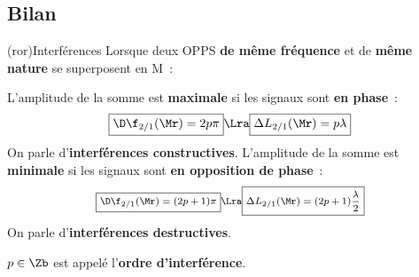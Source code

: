 \documentclass[../../main/main.tex]{subfiles}
\begin{document}
\subsection{Bilan}

\begin{tcb}[breakable](ror){Interférences}
	Lorsque deux OPPS \textbf{de même fréquence} et de \textbf{même nature} se
	superposent en M~:
	\begin{isd}
		L'amplitude de la somme est \textbf{maximale} si les signaux sont
		\textbf{en phase}~:
		\[
			\boxed{\D\f_{2/1}(\Mr) = 2p\pi}
			\Lra
			\boxed{\Delta{L}_{2/1}(\Mr) = p\lambda}
		\]
		On parle d'\textbf{interférences constructives}.
		\tcblower
		L'amplitude de la somme est \textbf{minimale} si les signaux sont
		\textbf{en opposition de phase}~:
		\[
			\footnotesize
			\boxed{\D\f_{2/1}(\Mr) = (2p+1)\pi}
			\Lra
			\boxed{\Delta{L}_{2/1}(\Mr) = (2p+1)\frac{\lambda}{2}}
		\]
		On parle d'\textbf{interférences destructives}.
	\end{isd}
	\centering$p\in\Zb$ est appelé l'\textbf{ordre d'interférence}.
\end{tcb}
\end{document}
